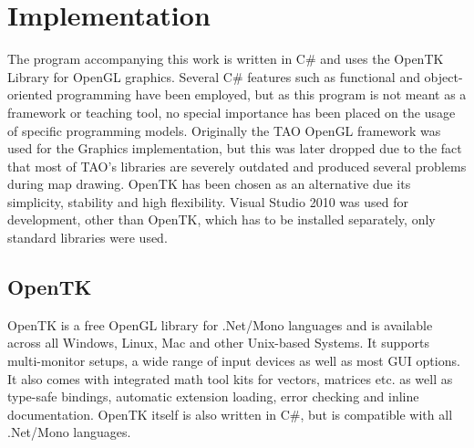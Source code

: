 \chapter{Implementation}
\label{cha:implementation}

The program accompanying this work is written in C# and uses the OpenTK Library for OpenGL graphics. Several C# features such as functional and object-oriented programming have been employed, but as this program is not meant as a framework or teaching tool, no special importance has been placed on the usage of specific programming models. 
Originally the TAO OpenGL framework was used for the Graphics implementation, but this was later dropped due to the fact that most of TAO's libraries are severely outdated and produced several problems during map drawing. OpenTK has been chosen as an alternative due its simplicity, stability and high flexibility. 
Visual Studio 2010 was used for development, other than OpenTK, which has to be installed separately, only standard libraries were used.

\section{OpenTK}
\label{sec:opentk}

OpenTK is a free OpenGL library for .Net/Mono languages and is available across all Windows, Linux, Mac and other Unix-based Systems. It supports multi-monitor setups, a wide range of input devices as well as most GUI options. It also comes with integrated math tool kits for vectors, matrices etc. as well as type-safe bindings, automatic extension loading, error checking and inline documentation. OpenTK itself is also written in C#, but is compatible with all .Net/Mono languages\cite{36}.




